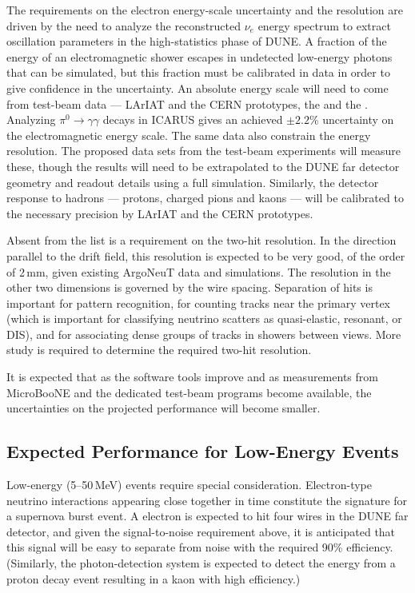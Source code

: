 The requirements on the electron energy-scale uncertainty and the
resolution are driven by the need to analyze the reconstructed $\nu_e$
energy spectrum to extract oscillation parameters in the
high-statistics phase of DUNE.  A fraction of the energy of an
electromagnetic shower escapes in undetected low-energy photons that
can be simulated, but this fraction must be calibrated in data in order to give
confidence in the uncertainty.  An absolute energy scale will need to
come from test-beam data --- LArIAT and the CERN prototypes, the
\cernsingleproto{} and the \cerndualproto.  Analyzing
$\pi^0\rightarrow\gamma\gamma$ decays in ICARUS\cite{ICARUS-pizero}
gives an achieved $\pm 2.2$\% uncertainty on the electromagnetic
energy scale.  The same data also constrain the energy resolution.
The proposed data sets from the test-beam experiments will 
measure these, though the results will need to be extrapolated to the
DUNE far detector geometry and readout details using a full
simulation.  Similarly, the detector response to hadrons --- protons,
charged pions and kaons --- will be calibrated to the necessary precision
by LArIAT and the CERN prototypes.


Absent from the list is a requirement on the two-hit resolution.  In the
direction parallel to the drift field, this resolution is expected to
be very good, of the order of 2\,mm, given existing ArgoNeuT data and
simulations.  The resolution in the other two dimensions is governed
by the wire spacing.  Separation of hits is important for pattern
recognition, for counting tracks near the primary vertex (which is
important for classifying neutrino scatters as quasi-elastic,
resonant, or DIS), and for associating dense groups of tracks in
showers between views.  More study is required to determine
the required two-hit resolution.

It is expected that as the software tools improve and as measurements
from MicroBooNE and the dedicated test-beam programs become
available, the uncertainties on the projected performance will become
smaller.

\subsection{Expected Performance for Low-Energy Events}\label{sec:detectors-fd-ref-perf-lowe}

Low-energy (5--50\,MeV) events require special consideration.
Electron-type neutrino interactions appearing close together in time
constitute the signature for a supernova burst event.  A  electron
is expected to hit four wires in the DUNE far detector, and given the
signal-to-noise requirement above, it is anticipated that this signal
will be easy to separate from noise with the required 90\% efficiency.
(Similarly, the photon-detection system is expected to detect the energy
from a proton decay event resulting in a  kaon with high
efficiency.)

